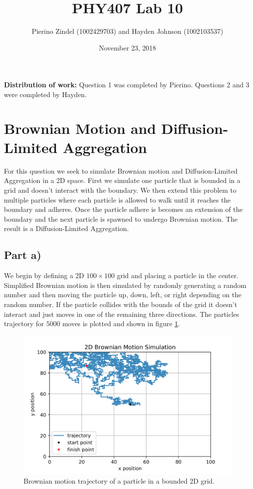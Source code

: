 \documentclass{article}
\title{PHY407 Lab 10}
\author{Pierino Zindel (1002429703) and Hayden Johnson (1002103537)}
\date{November 23, 2018}
\begin{document}
\maketitle

\noindent \textbf{Distribution of work:} Question 1 was completed by Pierino. Questions 2 and 3 were completed by Hayden.

\section{Brownian Motion and Diffusion-Limited Aggregation}
For this question we seek to simulate Brownian motion and Diffusion-Limited Aggregation in a 2D space. First we simulate one particle that is bounded in a grid and doesn't interact with the boundary. We then extend this problem to multiple particles where each particle is allowed to walk until it reaches the boundary and adheres. Once the particle adhere is becomes an extension of the boundary and the next particle is spawned to undergo Brownian motion. The result is a Diffusion-Limited Aggregation.

\subsection{Part a)}
We begin by defining a 2D $100\times 100$ grid and placing a particle in the center. Simplified Brownian motion is then simulated by randomly generating a random number and then moving the particle up, down, left, or right depending on the random number. If the particle collides with the bounds of the grid it doesn't interact and just moves in one of the remaining three directions. The particles trajectory for $5000$ moves is plotted and shown in figure \ref{fig:q1_a}.

\begin{figure}[H]
	\centering
	\includegraphics[width=\linewidth]{../images/Brownian_motion.png}
	\caption{Brownian motion trajectory of a particle in a bounded 2D grid.}
	\label{fig:q1_a}
\end{figure}
\end{document}
